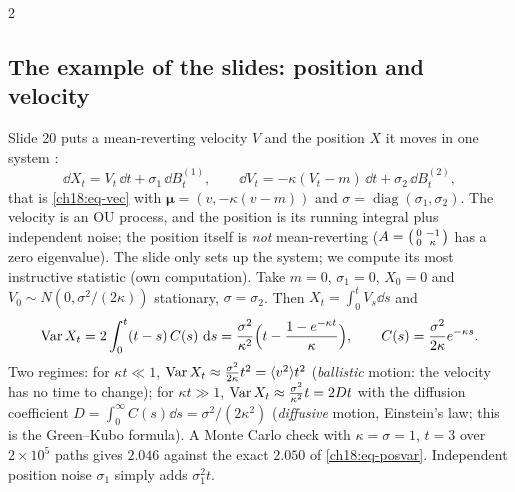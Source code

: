 \begin{paracol}{2}
\subsection{The example of the slides: position and velocity}
Slide 20 puts a mean-reverting velocity $V$ and the position $X$ it moves in one system :
\begin{equation}\label{ch18:eq-posvel}
  \dd X_t=V_t\,\dd t+\sigma_1\,\dd B^{(1)}_t,\qquad \dd V_t=-\kappa(V_t-m)\,\dd t+\sigma_2\,\dd B^{(2)}_t ,
\end{equation}
that is \eqref{ch18:eq-vec} with $\bm\mu=(v,-\kappa(v-m))$ and $\sigma=\operatorname{diag}(\sigma_1,\sigma_2)$. The velocity is an OU process, and the position is its running integral plus independent noise; the position itself is \emph{not} mean-reverting ($A=\begin{psmallmatrix}0&-1\\0&\kappa\end{psmallmatrix}$ has a zero eigenvalue). The slide only sets up the system; we compute its most instructive statistic (own computation). Take $m=0$, $\sigma_1=0$, $X_0=0$ and $V_0\sim N(0,\sigma^2/(2\kappa))$ stationary, $\sigma=\sigma_2$. Then $X_t=\int_0^tV_s\dd s$ and
\begin{equation}\label{ch18:eq-posvar}
  \operatorname{Var} X_t=2\int_0^t(t-s)\,C(s)\,\,\mathrm{d} s=\frac{\sigma^2}{\kappa^2}\Bigl(t-\frac{1-e^{-\kappa t}}{\kappa}\Bigr),\qquad C(s)=\frac{\sigma^2}{2\kappa}e^{-\kappa s}.
\end{equation}
Two regimes: for $\kappa t\ll1$, $\operatorname{Var} X_t\approx\frac{\sigma^2}{2\kappa}t^2=\langle v^2\rangle t^2$ (\emph{ballistic} motion: the velocity has no time to change); for $\kappa t\gg1$, $\operatorname{Var} X_t\approx\frac{\sigma^2}{\kappa^2}t=2Dt$ with the diffusion coefficient $D=\int_0^\infty C(s)\dd s=\sigma^2/(2\kappa^2)$ (\emph{diffusive} motion, Einstein's law; this is the Green--Kubo formula). A Monte Carlo check with $\kappa=\sigma=1$, $t=3$ over $2\times10^5$ paths gives $2.046$ against the exact $2.050$ of \eqref{ch18:eq-posvar}. Independent position noise $\sigma_1$ simply adds $\sigma_1^2t$.
\begin{figure}[ht]
\centering
{}
\end{figure}
\end{paracol}
